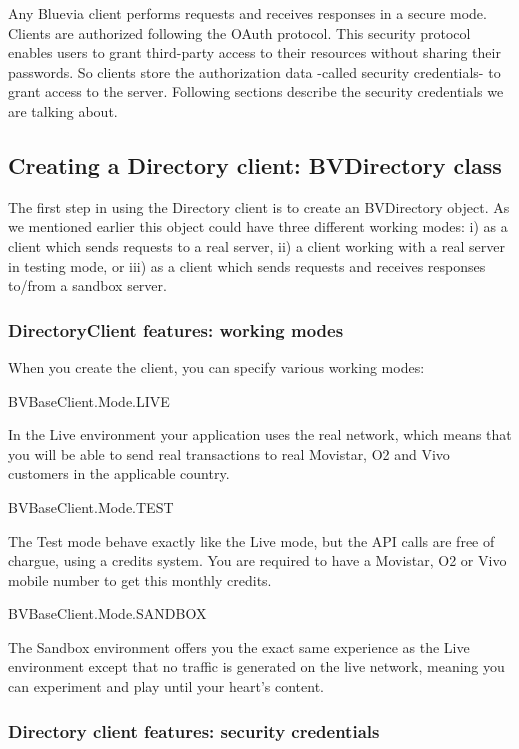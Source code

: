 Any Bluevia client performs requests and receives responses in a secure mode. Clients are authorized following the OAuth protocol. This security protocol enables users to grant third-\/party access to their resources without sharing their passwords. So clients store the authorization data -\/called security credentials-\/ to grant access to the server. Following sections describe the security credentials we are talking about.\hypertarget{blv_directory_guide_creating_directory_client_sec}{}\subsection{Creating a Directory client: BVDirectory class}\label{blv_directory_guide_creating_directory_client_sec}
The first step in using the Directory client is to create an BVDirectory object. As we mentioned earlier this object could have three different working modes: i) as a client which sends requests to a real server, ii) a client working with a real server in testing mode, or iii) as a client which sends requests and receives responses to/from a sandbox server.\hypertarget{blv_directory_guide_directoryclient_features_working_modes_sec}{}\subsubsection{DirectoryClient features: working modes}\label{blv_directory_guide_directoryclient_features_working_modes_sec}
When you create the client, you can specify various working modes: 
\begin{DoxyItemize}
\item BVBaseClient.Mode.LIVE \par
In the Live environment your application uses the real network, which means that you will be able to send real transactions to real Movistar, O2 and Vivo customers in the applicable country.


\item BVBaseClient.Mode.TEST \par
The Test mode behave exactly like the Live mode, but the API calls are free of chargue, using a credits system. You are required to have a Movistar, O2 or Vivo mobile number to get this monthly credits.


\item BVBaseClient.Mode.SANDBOX \par
The Sandbox environment offers you the exact same experience as the Live environment except that no traffic is generated on the live network, meaning you can experiment and play until your heart’s content. 
\end{DoxyItemize}\hypertarget{blv_directory_guide_directoryclient_features_security_credentials}{}\subsubsection{Directory client features: security credentials}\label{blv_directory_guide_directoryclient_features_security_credentials}
